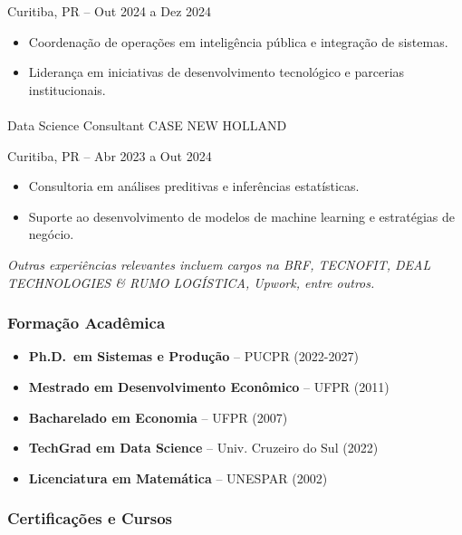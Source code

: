 \documentclass[
  letterpaper,
  DIV=11,
  numbers=noendperiod]{scrartcl}
\makeatletter
\let\oldparagraph\paragraph
\renewcommand{\paragraph}{
    \@ifstar
      \xxxParagraphStar
      \xxxParagraphNoStar
  }
\newcommand{\xxxParagraphStar}[1]{\oldparagraph*{#1}\mbox{}}
\newcommand{\xxxParagraphNoStar}[1]{\oldparagraph{#1}\mbox{}}
\providecommand{\tightlist}{%
  \setlength{\itemsep}{0pt}\setlength{\parskip}{0pt}}\usepackage{longtable,booktabs,array}
\makeatother
\begin{document}
{Curitiba, PR -- Out 2024 a Dez 2024}

\begin{itemize}
\tightlist
\item
  Coordenação de operações em inteligência pública e integração de
  sistemas.
\item
  Liderança em iniciativas de desenvolvimento tecnológico e parcerias
  institucionais.
\end{itemize}

\paragraph{Data Science Consultant \textbar{} CASE NEW
HOLLAND}\label{data-science-consultant-case-new-holland}

{Curitiba, PR -- Abr 2023 a Out 2024}

\begin{itemize}
\tightlist
\item
  Consultoria em análises preditivas e inferências estatísticas.
\item
  Suporte ao desenvolvimento de modelos de machine learning e
  estratégias de negócio.
\end{itemize}

\emph{Outras experiências relevantes incluem cargos na BRF, TECNOFIT,
DEAL TECHNOLOGIES \& RUMO LOGÍSTICA, Upwork, entre outros.}

\subsubsection{Formação Acadêmica}\label{formauxe7uxe3o-acaduxeamica}

\begin{itemize}
\tightlist
\item
  \textbf{Ph.D.~em Sistemas e Produção} -- PUCPR (2022-2027)
\item
  \textbf{Mestrado em Desenvolvimento Econômico} -- UFPR (2011)
\item
  \textbf{Bacharelado em Economia} -- UFPR (2007)
\item
  \textbf{TechGrad em Data Science} -- Univ. Cruzeiro do Sul (2022)
\item
  \textbf{Licenciatura em Matemática} -- UNESPAR (2002)
\end{itemize}

\subsubsection{Certificações e
Cursos}\label{certificauxe7uxf5es-e-cursos}
\end{document}
